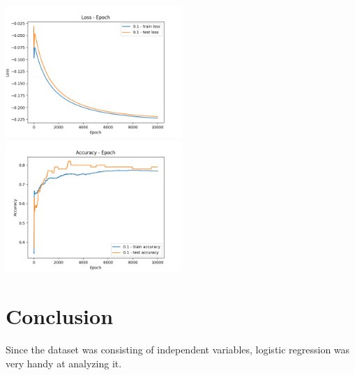 \documentclass[conference]{IEEEtran}
\begin{document}
\includegraphics[width=0.5\textwidth]{loss.png}
\includegraphics[width=0.5\textwidth]{accuracy.png}

\section{Conclusion}
Since the dataset  was consisting of independent variables, logistic regression was very handy at analyzing it.
\end{document}
